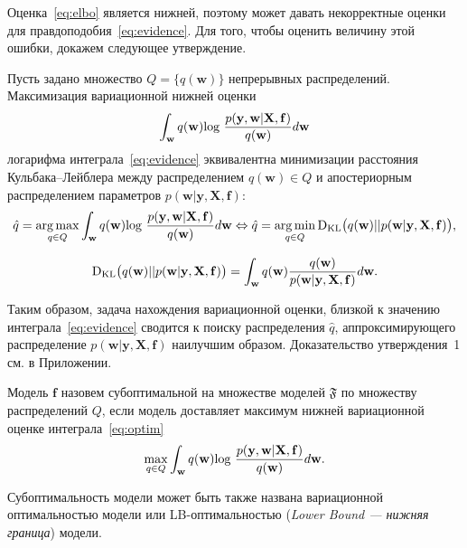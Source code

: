 Оценка~\eqref{eq:elbo} является нижней, поэтому может давать некорректные оценки для правдоподобия~\eqref{eq:evidence}. Для того, чтобы оценить величину этой ошибки, докажем следующее утверждение.

\label{st:st1} Пусть задано множество $Q = \{q(\mathbf{w})\}$ непрерывных распределений. Максимизация вариационной нижней оценки $$\int_{\mathbf{w}} q(\mathbf{w})\textnormal{log}~\frac{p(\mathbf{y},\mathbf{w}|\mathbf{X},\mathbf{f})}{q(\mathbf{w})}d\mathbf{w}$$  логарифма интеграла~\eqref{eq:evidence}  эквивалентна минимизации расстояния Кульбака--Лейблера между распределением $q(\mathbf{w}) \in Q$ и апостериорным распределением параметров $p(\mathbf{w}|\mathbf{y}, \mathbf{X}, \mathbf{f})$:
\begin{equation}
\label{eq:optim}
    \hat{q} = \operatorname*{arg\,max}_{q \in Q} \int_{\mathbf{w}} q(\mathbf{w})\textnormal{log}~\frac{p(\mathbf{y},\mathbf{w}|\mathbf{X},\mathbf{f})}{q(\mathbf{w})}d\mathbf{w} \Leftrightarrow 	
    \hat{q} = \operatorname*{arg\,min}_{q \in Q} \textnormal{D}_\textnormal{KL}  \bigl(q(\mathbf{w})||p(\mathbf{w}|\mathbf{y}, \mathbf{X}, \mathbf{f})\bigr),
\end{equation}

\[
	\textnormal{D}_\textnormal{KL}  \bigl(q(\mathbf{w})||p(\mathbf{w}|\mathbf{y}, \mathbf{X}, \mathbf{f})\bigr) =  \int_\mathbf{w} q(\mathbf{w}) \frac{q(\mathbf{w})}{p(\mathbf{w}|\mathbf{y}, \mathbf{X}, \mathbf{f})} d\mathbf{w}.
\]


Таким образом, задача нахождения вариационной оценки, близкой к значению интеграла~\eqref{eq:evidence} сводится к поиску распределения $\hat{q}$, аппроксимирующего распределение $p(\mathbf{w}|\mathbf{y}, \mathbf{X}, \mathbf{f})$ наилучшим образом. Доказательство утверждения~1 см. в Приложении.

Модель $\mathbf{f}$ назовем субоптимальной на множестве моделей $\mathfrak{F}$  по множеству распределений ${Q}$, если модель доставляет максимум нижней вариационной оценке интеграла~\eqref{eq:optim}
\begin{equation}
\label{eq:elbo2}
	\max_{q \in {Q}}\int_{\mathbf{w}} q(\mathbf{w})\textnormal{log}~\frac{p(\mathbf{y},\mathbf{w}|\mathbf{X},\mathbf{f})}{q(\mathbf{w})}d\mathbf{w}.
\end{equation}


{
Субоптимальность модели может быть также названа вариационной оптимальностью модели или LB-оптимальностью (\textit{Lower Bound --- нижняя граница}) модели.}

